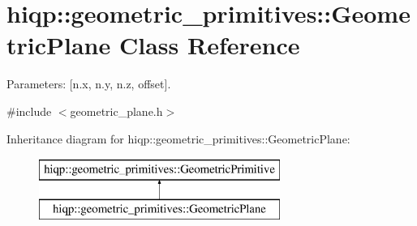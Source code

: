 \hypertarget{classhiqp_1_1geometric__primitives_1_1GeometricPlane}{\section{hiqp\-:\-:geometric\-\_\-primitives\-:\-:Geometric\-Plane Class Reference}
\label{classhiqp_1_1geometric__primitives_1_1GeometricPlane}
}


Parameters\-: \mbox{[}n.\-x, n.\-y, n.\-z, offset\mbox{]}.  




{\ttfamily \#include $<$geometric\-\_\-plane.\-h$>$}

Inheritance diagram for hiqp\-:\-:geometric\-\_\-primitives\-:\-:Geometric\-Plane\-:\begin{figure}[H]
\begin{center}
\leavevmode
\includegraphics[height=2.000000cm]{classhiqp_1_1geometric__primitives_1_1GeometricPlane}
\end{center}
\end{figure}
